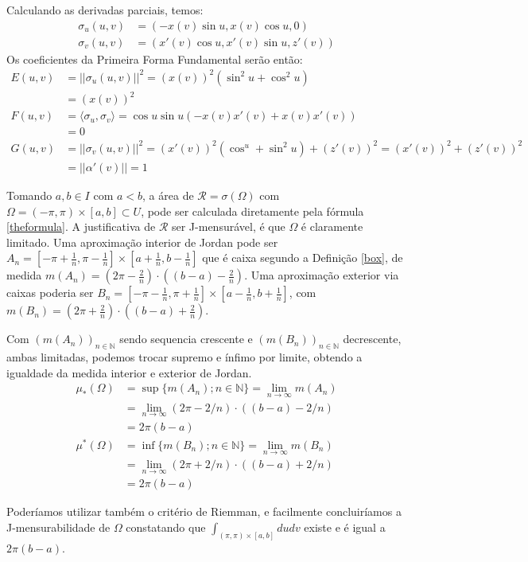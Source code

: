 \documentclass[12pt,letterpaper]{article}
\newcommand\rcur{\mathcal{R}}
\newcommand{\Int}{\displaystyle\int}
\begin{document}
Calculando as derivadas parciais, temos:
\begin{align*}
	\sigma_u(u,v)&=(-x(v)\sin u,x(v)\cos u,0)\\
	\sigma_v(u,v)&=(x'(v)\cos u,x'(v)\sin u,z'(v))
\end{align*}
Os coeficientes da Primeira Forma Fundamental serão então:
\begin{align*}
	E(u,v)&=||\sigma_u(u,v)||^2=(x(v))^2(\sin^2u+\cos^2u)\\&=(x(v))^2\\
	F(u,v)&=\langle\sigma_u,\sigma_v\rangle=\cos u\sin u(-x(v)x'(v)+x(v)x'(v))\\&=0\\
	G(u,v)&=||\sigma_v(u,v)||^2=(x'(v))^2(\cos^u+\sin^2u)+(z'(v))^2=(x'(v))^2+(z'(v))^2\\&=||\alpha'(v)||=1
\end{align*}

Tomando $a,b\in I$ com $a<b$, a área de $\rcur=\sigma(\Omega)$ com $\Omega=(-\pi,\pi)\times[a,b]\subset U$, pode ser calculada diretamente pela fórmula \ref{theformula}. A justificativa de $\rcur$ ser J-mensurável, é que $\Omega$ é claramente limitado. Uma aproximação interior de Jordan pode ser $A_n=[-\pi+\frac1n,\pi-\frac1n]\times[a+\frac1n,b-\frac1n]$ que é caixa segundo a Definição \ref{box}, de medida $m(A_n)=(2\pi-\frac2n)\cdot((b-a)-\frac2n)$. Uma aproximação exterior via caixas poderia ser $B_n=[-\pi-\frac1n,\pi+\frac1n]\times[a-\frac1n,b+\frac1n]$, com $m(B_n)=(2\pi+\frac2n)\cdot((b-a)+\frac2n)$. 

Com $(m(A_n))_{n\in\mathbb{N}}$ sendo sequencia crescente e $(m(B_n))_{n\in\mathbb{N}}$ decrescente, ambas limitadas, podemos trocar supremo e ínfimo por limite, obtendo a igualdade da medida interior e exterior de Jordan.
\begin{align*}
	\mu_*(\Omega)&=\sup\{m(A_n);n\in\mathbb{N}\}=\lim_{n\to\infty}m(A_n)\\
	&=\lim_{n\to\infty}(2\pi-2/n)\cdot((b-a)-2/n)\\
	&=2\pi(b-a)\\
	\mu^{*}(\Omega)&=\inf\{m(B_n);n\in\mathbb{N}\}=\lim_{n\to\infty}m(B_n)\\
	&=\lim_{n\to\infty}(2\pi+2/n)\cdot((b-a)+2/n)\\
		&=2\pi(b-a)
\end{align*}

Poderíamos utilizar também o critério de Riemman, e facilmente concluiríamos a J-mensurabilidade de $\Omega$ constatando que $\Int_{(\pi,\pi)\times[a,b]}dudv$ existe e é igual a $2\pi(b-a)$.
\end{document}
